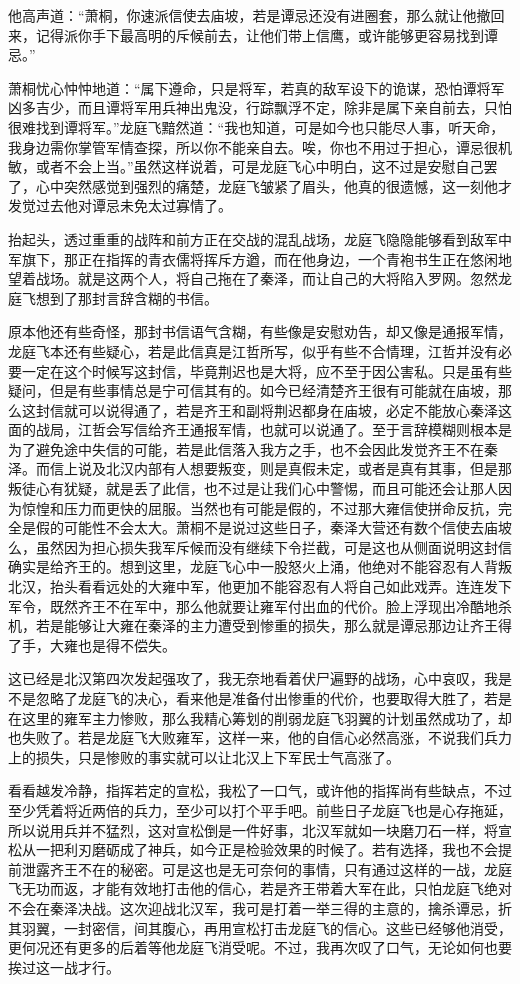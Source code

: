 他高声道：“萧桐，你速派信使去庙坡，若是谭忌还没有进圈套，那么就让他撤回来，记得派你手下最高明的斥候前去，让他们带上信鹰，或许能够更容易找到谭忌。”

萧桐忧心忡忡地道：“属下遵命，只是将军，若真的敌军设下的诡谋，恐怕谭将军凶多吉少，而且谭将军用兵神出鬼没，行踪飘浮不定，除非是属下亲自前去，只怕很难找到谭将军。”龙庭飞黯然道：“我也知道，可是如今也只能尽人事，听天命，我身边需你掌管军情查探，所以你不能亲自去。唉，你也不用过于担心，谭忌很机敏，或者不会上当。”虽然这样说着，可是龙庭飞心中明白，这不过是安慰自己罢了，心中突然感觉到强烈的痛楚，龙庭飞皱紧了眉头，他真的很遗憾，这一刻他才发觉过去他对谭忌未免太过寡情了。

抬起头，透过重重的战阵和前方正在交战的混乱战场，龙庭飞隐隐能够看到敌军中军旗下，那正在指挥的青衣儒将挥斥方遒，而在他身边，一个青袍书生正在悠闲地望着战场。就是这两个人，将自己拖在了秦泽，而让自己的大将陷入罗网。忽然龙庭飞想到了那封言辞含糊的书信。

原本他还有些奇怪，那封书信语气含糊，有些像是安慰劝告，却又像是通报军情，龙庭飞本还有些疑心，若是此信真是江哲所写，似乎有些不合情理，江哲并没有必要一定在这个时候写这封信，毕竟荆迟也是大将，应不至于因公害私。只是虽有些疑问，但是有些事情总是宁可信其有的。如今已经清楚齐王很有可能就在庙坡，那么这封信就可以说得通了，若是齐王和副将荆迟都身在庙坡，必定不能放心秦泽这面的战局，江哲会写信给齐王通报军情，也就可以说通了。至于言辞模糊则根本是为了避免途中失信的可能，若是此信落入我方之手，也不会因此发觉齐王不在秦泽。而信上说及北汉内部有人想要叛变，则是真假未定，或者是真有其事，但是那叛徒心有犹疑，就是丢了此信，也不过是让我们心中警惕，而且可能还会让那人因为惊惶和压力而更快的屈服。当然也有可能是假的，不过那大雍信使拼命反抗，完全是假的可能性不会太大。萧桐不是说过这些日子，秦泽大营还有数个信使去庙坡么，虽然因为担心损失我军斥候而没有继续下令拦截，可是这也从侧面说明这封信确实是给齐王的。想到这里，龙庭飞心中一股怒火上涌，他绝对不能容忍有人背叛北汉，抬头看看远处的大雍中军，他更加不能容忍有人将自己如此戏弄。连连发下军令，既然齐王不在军中，那么他就要让雍军付出血的代价。脸上浮现出冷酷地杀机，若是能够让大雍在秦泽的主力遭受到惨重的损失，那么就是谭忌那边让齐王得了手，大雍也是得不偿失。

这已经是北汉第四次发起强攻了，我无奈地看着伏尸遍野的战场，心中哀叹，我是不是忽略了龙庭飞的决心，看来他是准备付出惨重的代价，也要取得大胜了，若是在这里的雍军主力惨败，那么我精心筹划的削弱龙庭飞羽翼的计划虽然成功了，却也失败了。若是龙庭飞大败雍军，这样一来，他的自信心必然高涨，不说我们兵力上的损失，只是惨败的事实就可以让北汉上下军民士气高涨了。

看看越发冷静，指挥若定的宣松，我松了一口气，或许他的指挥尚有些缺点，不过至少凭着将近两倍的兵力，至少可以打个平手吧。前些日子龙庭飞也是心存拖延，所以说用兵并不猛烈，这对宣松倒是一件好事，北汉军就如一块磨刀石一样，将宣松从一把利刃磨砺成了神兵，如今正是检验效果的时候了。若有选择，我也不会提前泄露齐王不在的秘密。可是这也是无可奈何的事情，只有通过这样的一战，龙庭飞无功而返，才能有效地打击他的信心，若是齐王带着大军在此，只怕龙庭飞绝对不会在秦泽决战。这次迎战北汉军，我可是打着一举三得的主意的，擒杀谭忌，折其羽翼，一封密信，间其腹心，再用宣松打击龙庭飞的信心。这些已经够他消受，更何况还有更多的后着等他龙庭飞消受呢。不过，我再次叹了口气，无论如何也要挨过这一战才行。

